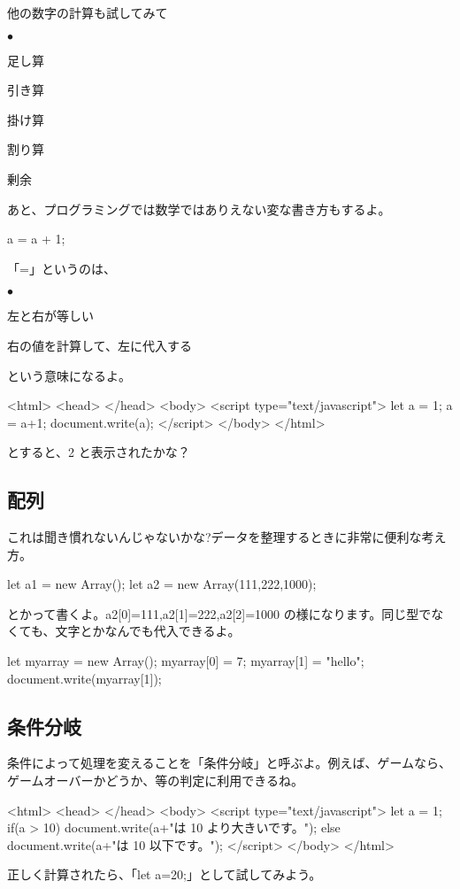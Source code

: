 \documentclass[mingoth,11pt,a4j,uplatex]{jsarticle}
\renewenvironment{description}%
{%
   \begin{list}{\parbox{1zw}{$\bullet$}}%
   {%
      \setlength{\topsep}{1zh}
      \setlength{\itemindent}{3zw}
      \setlength{\leftmargin}{5zw}%
      \setlength{\rightmargin}{0zw}%
      \setlength{\labelsep}{1zw}%
      \setlength{\labelwidth}{3zw}%
      \setlength{\itemsep}{0em}%
      \setlength{\parsep}{0em}%
      \setlength{\listparindent}{0zw}%
   }
}{%
   \end{list}%
}
\begin{document}
他の数字の計算も試してみて
\begin{description}
\item[+] 足し算
\item[-] 引き算
\item[*] 掛け算
\item[/] 割り算
\item[\%] 剰余
\end{description}

あと、プログラミングでは数学ではありえない変な書き方もするよ。
\begin{verbatimtab}
	a = a + 1;
\end{verbatimtab}
「=」というのは、
\begin{description}
\item[数学]左と右が等しい
\item[プログラミング]右の値を計算して、左に代入する
\end{description}
という意味になるよ。
\begin{verbatimtab}
<html>
	<head>
	</head>
	<body>
		<script type="text/javascript">
			let a = 1;
			a = a+1;
			document.write(a);
		</script>
	</body>
</html>
\end{verbatimtab}
とすると、2 と表示されたかな？

\subsection{配列}
これは聞き慣れないんじゃないかな?データを整理するときに非常に便利な考え方。
\begin{verbatimtab}
	let a1 = new Array();
	let a2 = new Array(111,222,1000);
\end{verbatimtab}	
とかって書くよ。a2[0]=111,a2[1]=222,a2[2]=1000 の様になります。同じ型でなくても、文字とかなんでも代入できるよ。

\begin{verbatimtab}
	let myarray = new Array();
	myarray[0] = 7;
	myarray[1] = "hello";
	document.write(myarray[1]);
\end{verbatimtab}


\subsection{条件分岐}
条件によって処理を変えることを「条件分岐」と呼ぶよ。例えば、ゲームなら、ゲームオーバーかどうか、等の判定に利用できるね。
\begin{verbatimtab}
<html>
	<head>
	</head>
	<body>
		<script type="text/javascript">
			let a = 1;
			if(a > 10){
				document.write(a+"は 10 より大きいです。"); 
			} else {
				document.write(a+"は 10 以下です。"); 
			}
		</script>
	</body>
</html>
\end{verbatimtab}
正しく計算されたら、「let a=20;」として試してみよう。
\end{document}
